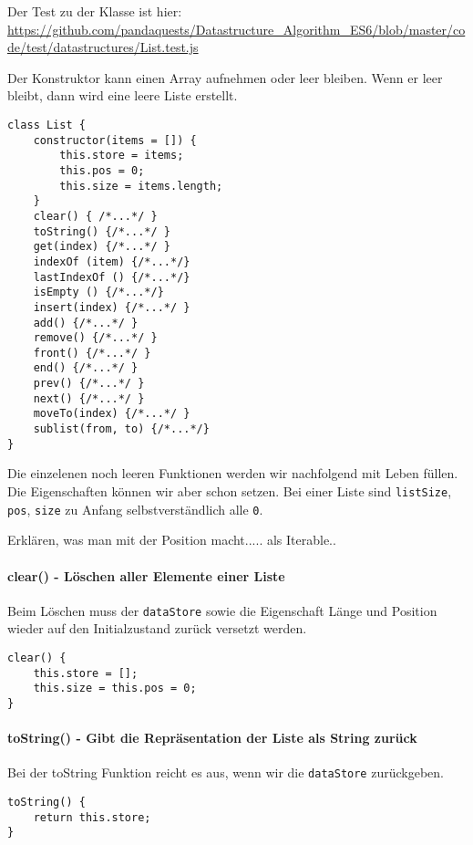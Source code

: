 \documentclass{book}
\begin{document}
Der Test zu der Klasse ist hier: \url{https://github.com/pandaquests/Datastructure_Algorithm_ES6/blob/master/code/test/datastructures/List.test.js}

Der Konstruktor kann einen Array aufnehmen oder leer bleiben. Wenn er leer bleibt, dann wird eine leere Liste erstellt.

\begin{lstlisting}[caption=Array Konstruktor]
class List {
	constructor(items = []) {
		this.store = items;
		this.pos = 0;
		this.size = items.length;
	}
	clear() { /*...*/ }
	toString() {/*...*/ }
	get(index) {/*...*/ }
	indexOf (item) {/*...*/}
	lastIndexOf () {/*...*/}
	isEmpty () {/*...*/}
	insert(index) {/*...*/ }
	add() {/*...*/ }
	remove() {/*...*/ }
	front() {/*...*/ }
	end() {/*...*/ }
	prev() {/*...*/ }
	next() {/*...*/ }
	moveTo(index) {/*...*/ }
	sublist(from, to) {/*...*/}
}
\end{lstlisting}

Die einzelenen noch leeren Funktionen werden wir nachfolgend mit Leben füllen. Die Eigenschaften können wir aber schon setzen. Bei einer Liste sind \lstinline|listSize|, \lstinline|pos|, \lstinline|size| zu Anfang selbstverständlich alle \lstinline|0|.

Erklären, was man mit der Position macht..... als Iterable..

\paragraph{clear() - Löschen aller Elemente einer Liste}
Beim Löschen muss der \lstinline|dataStore| sowie die Eigenschaft Länge und Position wieder auf den Initialzustand zurück versetzt werden.

\begin{lstlisting}[caption=Array Konstruktor]
clear() {
	this.store = [];
	this.size = this.pos = 0;	
}
\end{lstlisting}

\paragraph{toString() - Gibt die Repräsentation der Liste als String zurück} Bei der toString Funktion reicht es aus, wenn wir die \lstinline|dataStore| zurückgeben.

\begin{lstlisting}[caption=Array Konstruktor]
toString() {
	return this.store;
}
\end{lstlisting}
\end{document}

